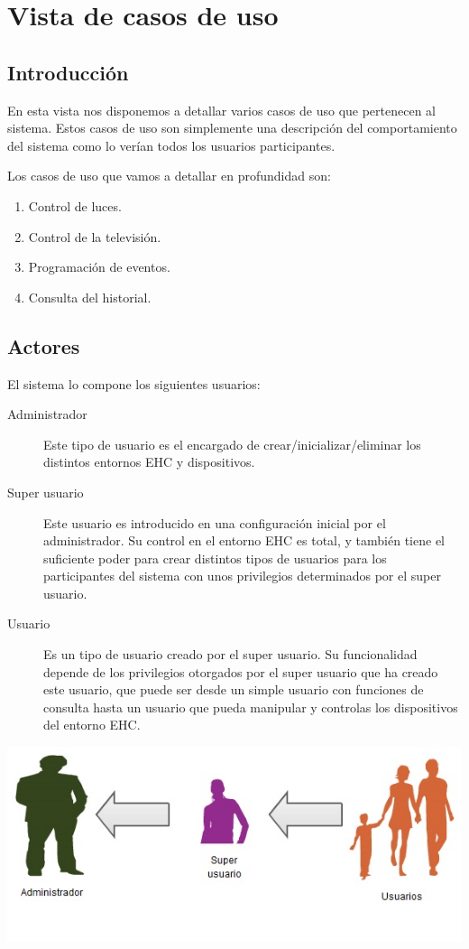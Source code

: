 \chapter{Vista de casos de uso}
\section{Introducci\'on}
En esta vista nos disponemos a detallar varios casos de uso que pertenecen al sistema. Estos casos de uso son simplemente una descripci\'on del comportamiento del sistema como lo ver\'ian todos los usuarios participantes.

Los casos de uso que vamos a detallar en profundidad son:
\begin{enumerate}
\item Control de luces.
\item Control de la televisi\'on.
\item Programaci\'on de eventos.
\item Consulta del historial.
\end{enumerate}

\section{Actores}
El sistema lo compone los siguientes usuarios:
\begin{description}
\item[Administrador] Este tipo de usuario es el encargado de crear/inicializar/eliminar los distintos entornos EHC y dispositivos.
\item[Super usuario] Este usuario es introducido en una configuraci\'on inicial por el administrador. Su control en el entorno EHC es total, y tambi\'en tiene el suficiente poder para crear distintos tipos de usuarios para los participantes del sistema con unos privilegios determinados por el super usuario. 
\item[Usuario] Es un tipo de usuario creado por el super usuario. Su funcionalidad depende de los privilegios otorgados por el super usuario que ha creado este usuario, que puede ser desde un simple usuario con funciones de consulta hasta un usuario que pueda manipular y controlas los dispositivos del entorno EHC.
\end{description}

\includegraphics{4.Disenio/Imagenes/Actores}


